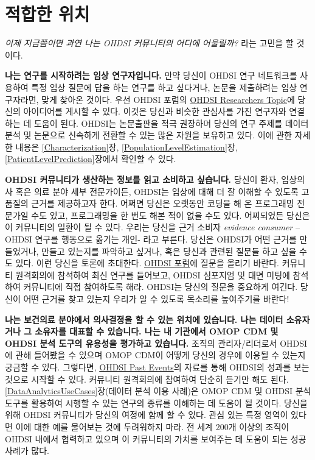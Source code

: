 \documentclass[10.5pt]{book}
\theoremstyle{definition}
\theoremstyle{definition}
\theoremstyle{definition}
\theoremstyle{remark}
\begin{document}
\section{적합한 위치}\label{-}

\emph{이제 지금쯤이면 과연 나는 OHDSI 커뮤니티의 어디에 어울릴까?} 라는
고민을 할 것이다.

\textbf{나는 연구를 시작하려는 임상 연구자입니다.} 만약 당신이 OHDSI
연구 네트워크를 사용하여 특정 임상 질문에 답을 하는 연구를 하고
싶다거나, 논문을 제출하려는 임상 연구자라면, 맞게 찾아온 것이다. 우선
OHDSI 포럼의 \href{https://forums.ohdsi.org/c/researchers}{OHDSI
Researchers Topic}에 당신의 아이디어를 게시할 수 있다. 이것은 당신과
비슷한 관심사를 가진 연구자와 연결하는 데 도움이 된다. OHDSI는
논문출판을 적극 권장하며 당신의 연구 주제를 데이터 분석 및 논문으로
신속하게 전환할 수 있는 많은 자원을 보유하고 있다. 이에 관한 자세한
내용은 \ref{Characterization}장, \ref{PopulationLevelEstimation}장,
\ref{PatientLevelPrediction}장에서 확인할 수 있다.

\textbf{OHDSI 커뮤니티가 생산하는 정보를 읽고 소비하고 싶습니다.} 당신이
환자, 임상의사 혹은 의료 분야 세부 전문가이든, OHDSI는 임상에 대해 더 잘
이해할 수 있도록 고품질의 근거를 제공하고자 한다. 어쩌면 당신은 오랫동안
코딩을 해 온 프로그래밍 전문가일 수도 있고, 프로그래밍을 한 번도 해본
적이 없을 수도 있다. 어찌되었든 당신은 이 커뮤니티의 일환이 될 수 있다.
우리는 당신을 근거 소비자 \emph{evidence consumer} -- OHDSI 연구를
행동으로 옮기는 개인- 라고 부른다. 당신은 OHDSI가 어떤 근거를
만들었거나, 만들고 있는지를 파악하고 싶거나, 혹은 당신과 관련된 질문들
하고 싶을 수도 있다. 이런 당신을 토론에 초대한다.
\href{http://forum.ohdsi.org}{OHDSI 포럼}에 질문을 올리기 바란다.
커뮤니티 원격회의에 참석하여 최신 연구를 들어보고, OHDSI 심포지엄 및
대면 미팅에 참석하여 커뮤니티에 직접 참여하도록 해라. OHDSI는 당신의
질문을 중요하게 여긴다. 당신이 어떤 근거를 찾고 있는지 우리가 알 수
있도록 목소리를 높여주기를 바란다!

\textbf{나는 보건의료 분야에서 의사결정을 할 수 있는 위치에 있습니다.
나는 데이터 소유자거나 그 소유자를 대표할 수 있습니다. 나는 내 기관에서
OMOP CDM 및 OHDSI 분석 도구의 유용성을 평가하고 있습니다.} 조직의
관리자/리더로서 OHDSI에 관해 들어봤을 수 있으며 OMOP CDM이 어떻게 당신의
경우에 이용될 수 있는지 궁금할 수 있다. 그렇다면,
\href{https://www.ohdsi.org/past-events/}{OHDSI Past Events}의 자료를
통해 OHDSI의 성과를 보는 것으로 시작할 수 있다. 커뮤니티 원격회의에
참여하여 단순히 듣기만 해도 된다. \ref{DataAnalyticsUseCases}장(데이터
분석 이용 사례)은 OMOP CDM 및 OHDSI 분석 도구를 활용하여 시행할 수 있는
연구의 종류를 이해하는 데 도움이 될 것이다. 당신을 위해 OHDSI 커뮤니티가
당신의 여정에 함께 할 수 있다. 관심 있는 특정 영역이 있다면 이에 대한
예를 물어보는 것에 두려워하지 마라. 전 세계 200개 이상의 조직이 OHDSI
내에서 협력하고 있으며 이 커뮤니티의 가치를 보여주는 데 도움이 되는 성공
사례가 많다.
\end{document}
